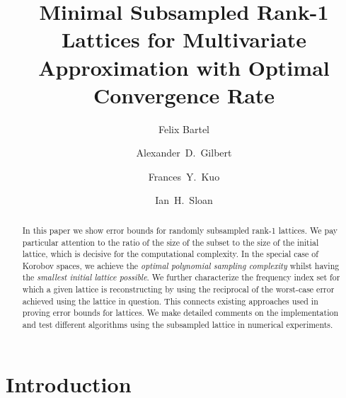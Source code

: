 \documentclass[a4paper]{amsart}
\begin{document}
 


\title[Minimal Subsampled Rank-1 Lattices]{Minimal Subsampled Rank-1 Lattices for Multivariate Approximation with Optimal Convergence Rate}

\author{Felix Bartel}
\address{Mathematisch-Geographische Fakultät, KU Eichstätt-Ingolstadt, 85270 Eichstätt, Germany.}

\author{Alexander~D.~Gilbert}
\address{School of Mathematics and Statistics, University of New South Wales, Sydney NSW 2052, Australia.}

\author{Frances~Y.~Kuo}
\address{School of Mathematics and Statistics, University of New South Wales, Sydney NSW 2052, Australia.}

\author{Ian~H.~Sloan}
\address{School of Mathematics and Statistics, University of New South Wales, Sydney NSW 2052, Australia.}



\begin{abstract} In this paper we show error bounds for randomly subsampled rank-1 lattices.
    We pay particular attention to the ratio of the size of the subset to the size of the initial lattice, which is decisive for the computational complexity.
    In the special case of Korobov spaces, we achieve the \emph{optimal polynomial sampling complexity} whilst having the \emph{smallest initial lattice possible}.
    We further characterize the frequency index set for which a given lattice is reconstructing by using the reciprocal of the worst-case error achieved using the lattice in question.
    This connects existing approaches used in proving error bounds for lattices.
    We make detailed comments on the implementation and test different algorithms using the subsampled lattice in numerical experiments.

\end{abstract} 

\maketitle

\section{Introduction} 
\end{document}
